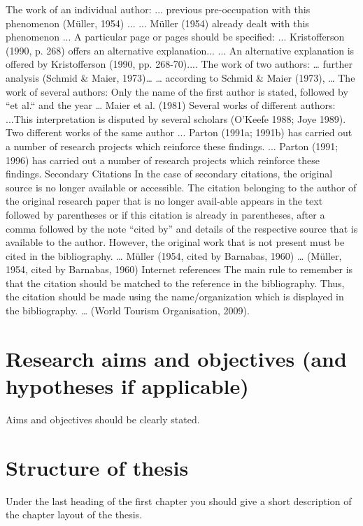 The work of an individual author:
... previous pre-occupation with this phenomenon (Müller, 1954) ...
... Müller (1954) already dealt with this phenomenon ...
A particular page or pages should be specified:
... Kristofferson (1990, p. 268) offers an alternative explanation...
... An alternative explanation is offered by Kristofferson (1990, pp. 268-70)....
The work of two authors:
… further analysis (Schmid \& Maier, 1973)…
… according to Schmid \& Maier (1973), …
The work of several authors:
Only the name of the first author is stated, followed by “et al.“ and the year
… Maier et al. (1981)
Several works of different authors:
...This interpretation is disputed by several scholars (O’Keefe 1988; Joye 1989).
Two different works of the same author
... Parton (1991a; 1991b) has carried out a number of research projects which reinforce these findings.
... Parton (1991; 1996) has carried out a number of research projects which reinforce these findings.
Secondary Citations
In the case of secondary citations, the original source is no longer available or accessible. The citation belonging to the author of the original research paper that is no longer avail-able appears in the text followed by parentheses or if this citation is already in parentheses, after a comma followed by the note “cited by” and details of the respective source that is available to the author. However, the original work that is not present must be cited in the bibliography.
… Müller (1954, cited by Barnabas, 1960) 
… (Müller, 1954, cited by Barnabas, 1960)
Internet references
The main rule to remember is that the citation should be matched to the reference in the bibliography. Thus, the citation should be made using the name/organization which is displayed in the bibliography.
… (World Tourism Organisation, 2009). 

\section{Research aims and objectives (and hypotheses if applicable)}
\label{sec:aims}
Aims and objectives should be clearly stated. 

\section{Structure of thesis}
\label{sec:structure}
Under the last heading of the first chapter you should give a short description of the chapter layout of the thesis.



